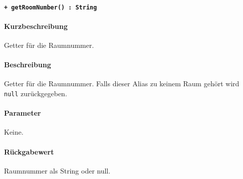\paragraph{\texttt{+ getRoomNumber() : String}}\label{AP_Alias_getRoomNumber}%
\paragraph*{Kurzbeschreibung}
Getter für die Raumnummer.
\paragraph*{Beschreibung}
Getter für die Raumnummer.
Falls dieser Alias zu keinem Raum gehört wird \verb#null# zurückgegeben.
\paragraph*{Parameter}
Keine.
\paragraph*{Rückgabewert}
Raumnummer als String oder null.